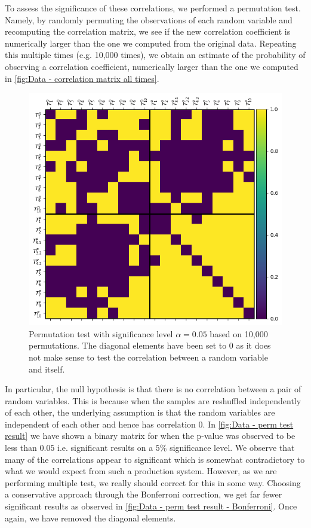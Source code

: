 \documentclass[../Thesis.tex]{subfiles}
\begin{document}
To assess the significance of these correlations, we performed a permutation test. Namely, by randomly permuting the observations of each random variable and recomputing the correlation matrix, we see if the new correlation coefficient is numerically larger than the one we computed from the original data. Repeating this multiple times (e.g. 10,000 times), we obtain an estimate of the probability of observing a correlation coefficient, numerically larger than the one we computed in \autoref{fig:Data - correlation matrix all times}.
\begin{figure}[ht]
    \centering
    \includegraphics[width=.9\linewidth]{figures/Multiple cycles data/Permutation test rho 10 mil.png}
    \caption{Permutation test with significance level $\alpha = 0.05$ based on 10,000 permutations. The diagonal elements have been set to $0$ as it does not make sense to test the correlation between a random variable and itself.}
    \label{fig:Data - perm test result}
\end{figure}
In particular, the null hypothesis is that there is no correlation between a pair of random variables. This is because when the samples are reshuffled independently of each other, the underlying assumption is that the random variables are independent of each other and hence has correlation $0$. In \autoref{fig:Data - perm test result} we have shown a binary matrix for when the p-value was observed to be less than $0.05$ i.e. significant results on a $5\%$ significance level. We observe that many of the correlations appear to significant which is somewhat contradictory to what we would expect from such a production system. However, as we are performing multiple test, we really should correct for this in some way. Choosing a conservative approach through the Bonferroni correction, we get far fewer significant results as observed in \autoref{fig:Data - perm test result - Bonferroni}. Once again, we have removed the diagonal elements.
\end{document}
